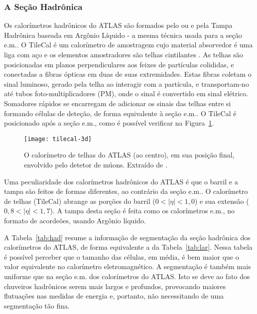 \subsubsection{A Seção Hadrônica}

Os calorímetros hadrônicos do ATLAS são formados pelo  ou  e pela Tampa Hadrônica baseada em Argônio Líquido
- a mesma técnica usada para a seção e.m.. O TileCal é um calorímetro de
amostragem cujo material absorvedor é uma liga com aço e os elementos
amostradores são telhas cintilantes \cite{tilecal}. As telhas são posicionadas
em planos perpendiculares aos feixes de partículas colididas, e conectadas a
fibras ópticas em duas de suas extremidades. Estas fibras coletam o sinal
luminoso, gerado pela telha ao interagir com a partícula, e transportam-no até
tubos foto-multiplicadores (PM), onde o
sinal é convertido em sinal elétrico. Somadores rápidos \cite{seixas:adder} se
encarregam de adicionar os sinais das telhas entre si formando células de
deteção, de forma equivalente à seção e.m.. O TileCal é posicionado após a
seção e.m., como é possível verificar na Figura~\ref{fig:tile-pos}.

\begin{figure}
\begin{center}
\texttt{[image: tilecal-3d]}
\end{center}
\caption{O calorímetro de telhas do ATLAS (ao centro), em sua posição
final, envolvido pelo detetor de múons. Extraído de \cite{cern}.}
\label{fig:tile-pos}
\end{figure}

Uma peculiaridade dos calorímetros hadrônicos do ATLAS é que o barril e a
tampa são feitos de formas diferentes, ao contrário da seção e.m.. O
calorímetro de telhas (TileCal) abrange as porções do barril ($0<|\eta|<1,0$)
e sua extensão ($0,8<|\eta|<1,7$). A tampa desta seção é feita como os
calorímetros e.m., no formato de acordeões, usando Argônio líquido.

A Tabela~\ref{tab:had} resume a informação de segmentação da seção hadrônica
dos calorímetros do ATLAS, de forma equivalente a da Tabela~\ref{tab:lar}.
Nessa tabela é possível perceber que o tamanho das células, em média, é bem
maior que o valor equivalente no calorímetro eletromagnético. A segmentação
é também mais uniforme que na seção e.m. dos calorímetros do ATLAS. Isto se
deve ao fato dos chuveiros hadrônicos serem mais largos e profundos,
provocando maiores flutuações nas medidas de energia e, portanto, não
necessitando de uma segmentação tão fina.

